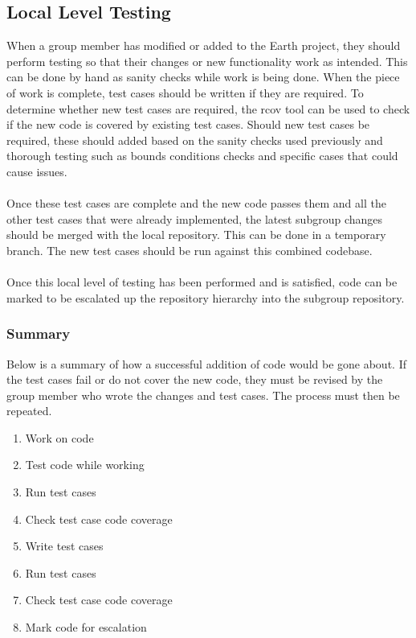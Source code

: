 \documentclass{article}
\begin{document}
\subsection{Local Level Testing}
\label{local}
When a group member has modified or added to the Earth project, they should perform testing so that their changes or new functionality work as intended. This can be done by hand as sanity checks while work is being done. When the piece of work is complete, test cases should be written if they are required. To determine whether new test cases are required, the rcov tool can be used to check if the new code is covered by existing test cases. Should new test cases be required, these should added based on the sanity checks used previously and thorough testing such as bounds conditions checks and specific cases that could cause issues.\\
\\
Once these test cases are complete and the new code passes them and all the other test cases that were already implemented, the latest subgroup changes should be merged with the local repository. This can be done in a temporary branch. The new test cases should be run against this combined codebase.\\
\\
Once this local level of testing has been performed and is satisfied, code can be marked to be escalated up the repository hierarchy into the subgroup repository.

\subsubsection{Summary}
Below is a summary of how a successful addition of code would be gone about. If the test cases fail or do not cover the new code, they must be revised by the group member who wrote the changes and test cases. The process must then be repeated.
\begin{enumerate}
	\item Work on code
	\item Test code while working
	\item Run test cases
	\item Check test case code coverage
	\item Write test cases
	\item Run test cases
	\item Check test case code coverage
	\item Mark code for escalation
\end{enumerate}
\end{document}
